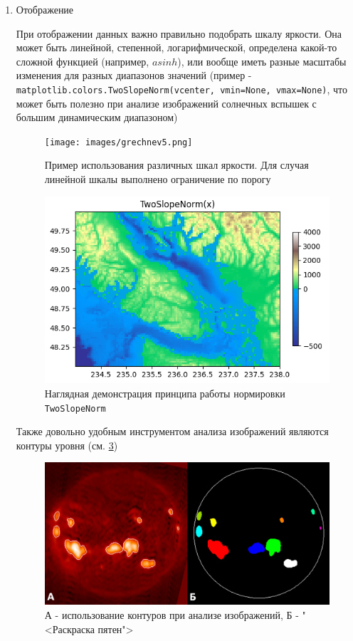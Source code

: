 \begin{enumerate}
	\item \textsf{Отображение}
	
	При отображении данных важно правильно подобрать шкалу яркости. Она может быть линейной, степенной, логарифмической, определена какой-то сложной функцией (например, $asinh$), или вообще иметь разные масштабы изменения для разных диапазонов значений (пример -\\ \texttt{matplotlib.colors.TwoSlopeNorm(vcenter, vmin=None, vmax=None)}, что может быть полезно при анализе изображений солнечных вспышек с большим динамическим диапазоном)
	
	\begin{figure}[h!]
		\centering
		\texttt{[image: images/grechnev5.png]}
		\caption{Пример использования различных шкал яркости. Для случая линейной шкалы выполнено ограничение по порогу}
		\label{grechnev5}
	\end{figure}
	
	\begin{figure}[h!]
		\centering
		\includegraphics[width=0.7\linewidth]{images/grechnev6.png}
		\caption{Наглядная демонстрация принципа работы нормировки \texttt{TwoSlopeNorm}}
		\label{grechnev6}
	\end{figure}
	
	Также довольно удобным инструментом анализа изображений являются контуры уровня (см. \cref{grechnev7})
	
	\begin{figure}[h!]
		\centering
		\includegraphics[width=0.7\linewidth]{images/grechnev7.png}
		\caption{А - использование контуров при анализе изображений, Б - "<Раскраска пятен">}
		\label{grechnev7}
	\end{figure}
	

\end{enumerate}
